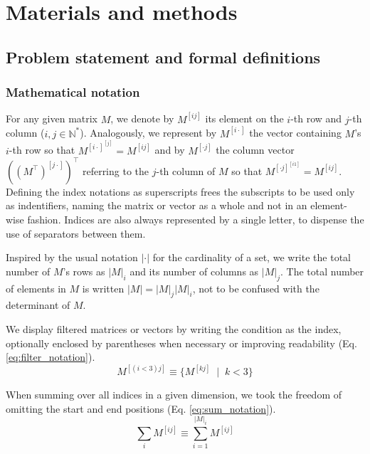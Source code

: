 \documentclass[conference]{IEEEtran}
\newcommand{\el}[1]{^{[#1]}}
\begin{document}


\section{Materials and methods}

\subsection{Problem statement and formal definitions}
\label{sec:definitions}

\subsubsection{Mathematical notation}

For any given matrix $M$, we denote by $M\el {ij}$ its element on the $i$-th row
and $j$-th column ($i, j \in \mathbb{N}^*$). Analogously, we represent by
$M\el{i\cdot}$ the vector containing $M$'s $i$-th row so that $M\el{i\cdot}\el j
= M\el{ij}$ and by $M\el{\cdot j}$ the column vector
$((M^\intercal)\el{j\cdot})^\intercal$ referring to the $j$-th column of $M$ so
that $M\el{\cdot j}\el{i1} = M\el{ij}$. Defining the index notations as
superscripts frees the subscripts to be used only as indentifiers, naming the
matrix or vector as a whole and not in an element-wise fashion. Indices are also
always represented by a single letter, to dispense the use of separators between
them.


Inspired by the usual notation $|\cdot|$ for the cardinality of a set, we write
the total number of $M$'s rows as $|M|_i$ and its number of columns as $|M|_j$.
The total number of elements in $M$ is written $|M| = |M|_j|M|_i$, not to be
confused with the determinant of $M$.

We display filtered matrices or vectors by writing the condition as the index,
optionally enclosed by parentheses when necessary or improving readability (Eq.
\ref{eq:filter_notation}).
%
\begin{equation*}
    M\el{(i<3)j} \equiv \{M\el{kj}\;\mid \; k < 3\}
    \label{eq:filter_notation}
\end{equation*}

When summing over all indices in a given dimension, we took the freedom of
omitting the start and end positions (Eq. \ref{eq:sum_notation}).
%
\begin{equation*}
    \sum_i M\el{ij} \equiv \sum_{i=1}^{|M|_i} M\el{ij}
    \label{eq:sum_notation}
\end{equation*}
\end{document}
